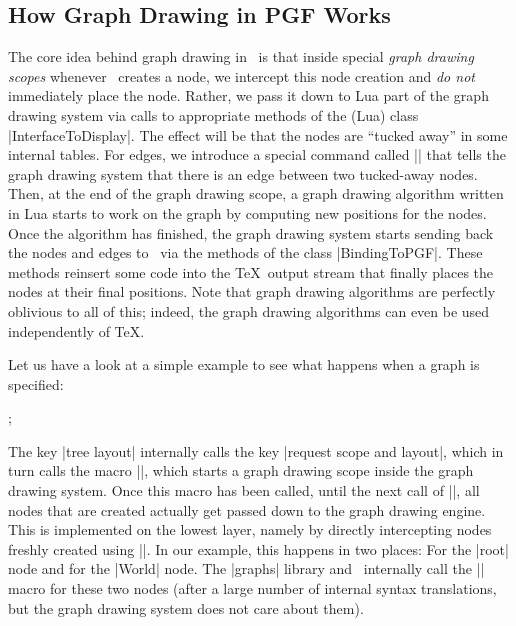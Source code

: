 \subsection{How Graph Drawing in PGF Works}

The core idea behind graph drawing in \pgfname\ is that inside special
\emph{graph drawing scopes} whenever \pgfname\ creates a node, we intercept
this node creation and \emph{do not} immediately place the node. Rather, we
pass it down to Lua part of the graph drawing system via calls to appropriate
methods of the (Lua) class |InterfaceToDisplay|. The effect will be that the
nodes are ``tucked away'' in some internal tables. For edges, we introduce a
special command called |\pgfgdedge| that tells the graph drawing system that
there is an edge between two tucked-away nodes. Then, at the end of the graph
drawing scope, a graph drawing algorithm written in Lua starts to work on the
graph by computing new positions for the nodes. Once the algorithm has
finished, the graph drawing system starts sending back the nodes and edges to
\pgfname\ via the methods of the class |BindingToPGF|. These methods reinsert
some code into the \TeX\ output stream that finally places the nodes at their
final positions. Note that graph drawing algorithms are perfectly oblivious to
all of this; indeed, the graph drawing algorithms can even be used
independently of \TeX.

Let us have a look at a simple example to see what happens when a graph is
specified:
%
\begin{codeexample}[preamble={\usetikzlibrary{graphs,graphdrawing}
\usegdlibrary{trees}}]
  ;
\end{codeexample}

The key |tree layout| internally calls the key |request scope and layout|,
which in turn calls the macro |\pgfgdbeginscope|, which starts a graph drawing
scope inside the graph drawing system. Once this macro has been called, until
the next call of |\pgfgdendscope|, all nodes that are created actually get
passed down to the graph drawing engine. This is implemented on the lowest
layer, namely by directly intercepting nodes freshly created using |\pgfnode|.
In our example, this happens in two places: For the |root| node and for the
|World| node. The |graphs| library and \tikzname\ internally call the
|\pgfnode| macro for these two nodes (after a large number of internal syntax
translations, but the graph drawing system does not care about them).

